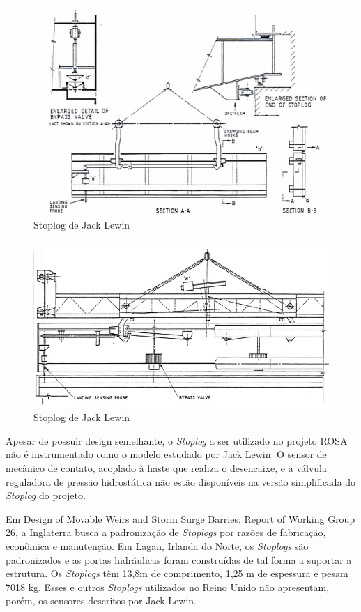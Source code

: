 \begin{figure}[H]
    \centering
    \includegraphics[width=1\columnwidth]{figs/pesqbib/7.png}
    \caption{Stoplog de Jack Lewin}
    \label{pesqbib_7}
\end{figure} 

\begin{figure}[H]
    \centering
    \includegraphics[width=1\columnwidth]{figs/pesqbib/8.png}
    \caption{Stoplog de Jack Lewin}
    \label{pesqbib_8}
\end{figure}  
 
Apesar de possuir design semelhante, o \emph{Stoplog} a ser utilizado no projeto ROSA não é instrumentado como o modelo estudado por Jack Lewin. O sensor de mecânico de contato, acoplado à haste que realiza o desencaixe, e a válvula reguladora de pressão hidrostática não estão disponíveis na versão simplificada do \emph{Stoplog} do projeto.

Em Design of Movable Weirs and Storm Surge Barries: Report of Working Group 26,
a Inglaterra busca a padronização de \emph{Stoplogs} por razões de fabricação, 
econômica e manutenção. Em Lagan, Irlanda do Norte, os \emph{Stoplogs} são padronizados 
e as portas hidráulicas foram construídas de tal forma a suportar a estrutura. 
Os \emph{Stoplogs} têm 13,8m de comprimento, 1,25 m de espessura e pesam 7018 kg. 
Esses e outros \emph{Stoplogs} utilizados no Reino Unido não apresentam, porém,
os sensores descritos por Jack Lewin. 

